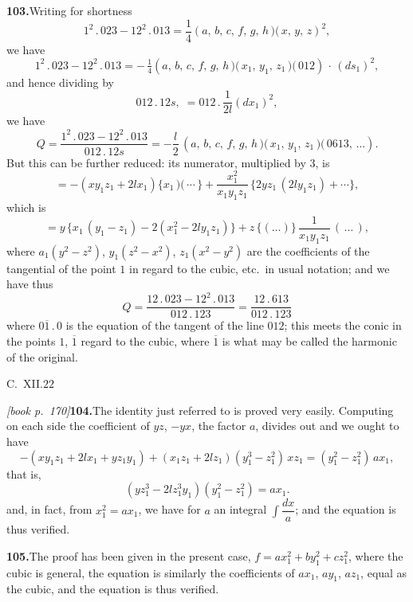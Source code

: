 \documentclass[11pt,a4paper]{article}
\begin{document}
\medskip\noindent\textbf{103.}\quad Writing for shortness
\[
1^2\,.\,023 - 12^2\,.\,013 = \frac{1}{4}(a,\,b,\,c,\,f,\,g,\,h\!\,\mbox{$)\!($}\,x,\,y,\,z)^2,
\]
we have
\[
1^2\,.\,023 - 12^2\,.\,013 = -\,\tfrac{1}{4}(a,\,b,\,c,\,f,\,g,\,h\!\,\mbox{$)\!($}\,x_1,\,y_1,\,z_1\,\mbox{$)\!($}\,012)\,\cdot\,(d s_1)^2,
\]
and hence dividing by
\[
012\,.\,12s,\;= 012\,.\,\frac{1}{2l}(dx_1)^2,
\]
we have
\[
Q = \frac{1^2\,.\,023 - 12^2\,.\,013}{012\,.\,12s} = -\frac{l}{2}\,(a,\,b,\,c,\,f,\,g,\,h\!\,\mbox{$)\!($}\,x_1,\,y_1,\,z_1\,\mbox{$)\!($}\,0613,\,\ldots).
\]
But this can be further reduced: its numerator, multiplied by $3$, is
\[
= -(xy_1z_1 + 2lx_1)\bigl\{x_1\,\mbox{$)\!($}\,\cdots\!\,\bigr\} + \frac{x_1^2}{x_1y_1z_1}\,\bigl\{2yz_1\,(2ly_1z_1) + \cdots\bigr\},
\]
which is
\[
= y\,\bigl\{x_1\,(y_1 - z_1) - 2(x_1^2 - 2ly_1z_1)\bigr\} + z\,\bigl\{(\ldots)\bigr\}\,\frac{1}{x_1y_1z_1}\,(\,\ldots\,),
\]
where $a_1(y^2 - z^2)$, $y_1(z^2 - x^2)$, $z_1(x^2 - y^2)$ are the coefficients of the tangential of the point $1$ in regard to the cubic, etc.\ in usual notation; and we have thus
\[
Q = \frac{12\,.\,023 - 12^2\,.\,013}{012\,.\,123} = \frac{12\,.\,613}{012\,.\,123}
\]
where $0\overline{1}\,.\,0$ is the equation of the tangent of the line $012$; this meets the conic in the points $1$, $\overline{1}$ regard to the cubic, where $\overline{1}$ is what may be called the harmonic of the original.

\hfill C.\ XII.\hfill $22$

\medskip\noindent\textit{[book p.~170]}\quad \textbf{104.}\quad The identity just referred to is proved very easily. Computing on each side the coefficient of $yz$, $-yx$, the factor $a$, divides out and we ought to have
\[
-(xy_1z_1 + 2lx_1 + yz_1y_1) + (x_1 z_1 + 2lz_1)(y_1^3 - z_1^2)\,xz_1 = (y_1^2 - z_1^2)\,a x_1,
\]
that is,
\[
(yz_1^3 - 2lz_1^3 y_1)(y_1^2 - z_1^2) = ax_1.
\]
and, in fact, from $x_1^2 = ax_1$, we have for $a$ an integral $\int\dfrac{dx}{a}$; and the equation is thus verified.

\medskip\noindent\textbf{105.}\quad The proof has been given in the present case, $f = ax_1^2 + by_1^2 + cz_1^2$, where the cubic is general, the equation is similarly the coefficients of $ax_1$, $a y_1$, $a z_1$, equal as the cubic, and the equation is thus verified.
\end{document}
